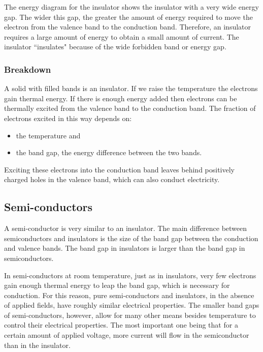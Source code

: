 The energy diagram for the insulator shows the insulator with a very wide energy gap. The wider this gap, the greater the amount of energy required to move the electron from the valence band to the conduction band. Therefore, an insulator requires a large amount of energy to obtain a small amount of current. The insulator ``insulates" because of the wide forbidden band or energy gap.

\subsubsection{Breakdown}

A solid with filled bands is an insulator. If we raise the temperature the electrons gain thermal energy. If there is enough energy added then electrons can be thermally excited from the valence band to the conduction band. The fraction of electrons excited in this way depends on:
\begin{itemize}
\item the temperature and
\item the band gap, the energy difference between the two bands.
\end{itemize}
Exciting these electrons into the conduction band leaves behind positively charged holes in the valence band, which can also conduct electricity.

\subsection{Semi-conductors}

A semi-conductor is very similar to an insulator. The main difference between semiconductors and insulators is the size of the band gap between the conduction and valence bands. The band gap in insulators is larger than the band gap in semiconductors.

In semi-conductors at room temperature, just as in insulators, very few electrons gain enough thermal energy to leap the band gap, which is necessary for conduction. For this reason, pure semi-conductors and insulators, in the absence of applied fields, have roughly similar electrical properties. The smaller band gaps of semi-conductors, however, allow for many other means besides temperature to control their electrical properties. The most important one being that for a certain amount of applied voltage, more current will flow in the semiconductor than in the insulator.

